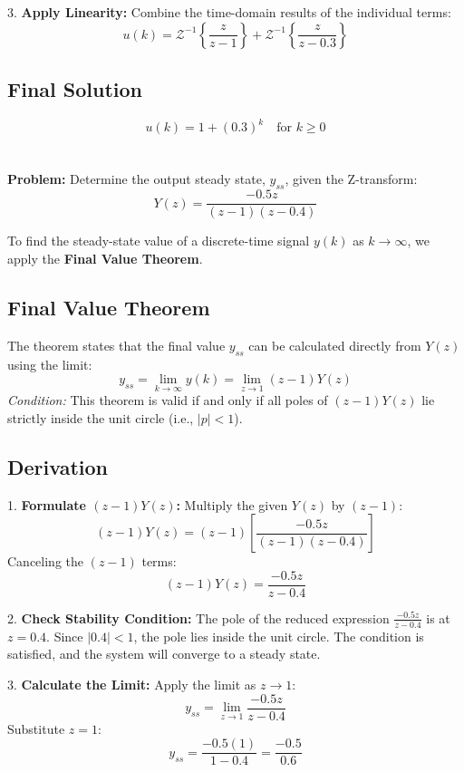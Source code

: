\documentclass[a4paper,12pt]{article}
\begin{document}
3.  \textbf{Apply Linearity:}
    Combine the time-domain results of the individual terms:
    $$ u(k) = \mathcal{Z}^{-1}\left\{ \frac{z}{z-1} \right\} + \mathcal{Z}^{-1}\left\{ \frac{z}{z-0.3} \right\} $$

\subsection{Final Solution}
$$ u(k) = 1 + (0.3)^k \quad \text{for } k \ge 0 $$

\section{}

\textbf{Problem:} Determine the output steady state, $y_{ss}$, given the Z-transform:
$$ Y(z) = \frac{-0.5z}{(z-1)(z-0.4)} $$

To find the steady-state value of a discrete-time signal $y(k)$ as $k \to \infty$, we apply the \textbf{Final Value Theorem}.

\subsection{Final Value Theorem}
The theorem states that the final value $y_{ss}$ can be calculated directly from $Y(z)$ using the limit:
$$ y_{ss} = \lim_{k \to \infty} y(k) = \lim_{z \to 1} (z-1)Y(z) $$
\textit{Condition:} This theorem is valid if and only if all poles of $(z-1)Y(z)$ lie strictly inside the unit circle (i.e., $|p| < 1$).

\subsection{Derivation}

1.  \textbf{Formulate $(z-1)Y(z)$:}
    Multiply the given $Y(z)$ by $(z-1)$:
    $$ (z-1)Y(z) = (z-1) \left[ \frac{-0.5z}{(z-1)(z-0.4)} \right] $$
    Canceling the $(z-1)$ terms:
    $$ (z-1)Y(z) = \frac{-0.5z}{z-0.4} $$

2.  \textbf{Check Stability Condition:}
    The pole of the reduced expression $\frac{-0.5z}{z-0.4}$ is at $z = 0.4$.
    Since $|0.4| < 1$, the pole lies inside the unit circle. The condition is satisfied, and the system will converge to a steady state.

3.  \textbf{Calculate the Limit:}
    Apply the limit as $z \to 1$:
    $$ y_{ss} = \lim_{z \to 1} \frac{-0.5z}{z-0.4} $$
    Substitute $z = 1$:
    $$ y_{ss} = \frac{-0.5(1)}{1 - 0.4} = \frac{-0.5}{0.6} $$
\end{document}

